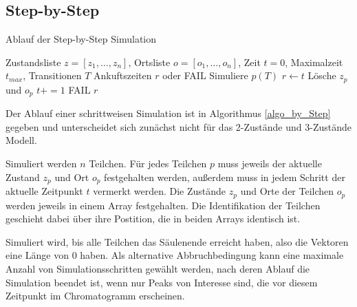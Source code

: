
\subsection{Step-by-Step}

\begin{algorithm}
\caption{Ablauf der Step-by-Step Simulation}
\label{algo_by_Step}
\begin{algorithmic}
\REQUIRE Zustandsliste $z= [z_1 , \ldots, z_n]$, Ortsliste $o=[o_1, \ldots , o_n]$, Zeit $t=0$, Maximalzeit $t_{max}$, Transitionen $T$
\ENSURE Ankuftszeiten $r$ oder FAIL
\STATE Simuliere $p(T)$
\STATE $r \leftarrow t$
\STATE Lösche $z_p$ und $o_p$
\ENDIF
\ENDFOR
\STATE $t +=1$
\ENDWHILE
{}
\RETURN FAIL
\ELSE
\RETURN $r$
\ENDIF
\end{algorithmic}
\end{algorithm}


Der Ablauf einer schrittweisen Simulation ist in Algorithmus \ref{algo_by_Step} gegeben und unterscheidet sich zunächst nicht für das 2-Zustände und 3-Zustände Modell.

Simuliert werden $n$ Teilchen. Für jedes Teilchen $p$ muss jeweils der aktuelle Zustand $z_p$ und Ort $o_p$ festgehalten werden, außerdem muss in jedem Schritt der aktuelle Zeitpunkt $t$ vermerkt werden. Die Zustände $z_p$ und Orte der Teilchen $o_p$ %
werden jeweils in einem Array festgehalten. Die Identifikation der Teilchen geschieht dabei über ihre Postition, die in beiden Arrays identisch ist.

Simuliert wird, bis alle Teilchen das Säulenende erreicht haben, also die Vektoren eine Länge von $0$ haben. 
Als alternative Abbruchbedingung kann eine maximale Anzahl von Simulationsschritten gewählt werden, nach deren Ablauf die Simulation beendet ist, wenn nur Peaks von Interesse sind, die vor diesem Zeitpunkt im Chromatogramm erscheinen.

